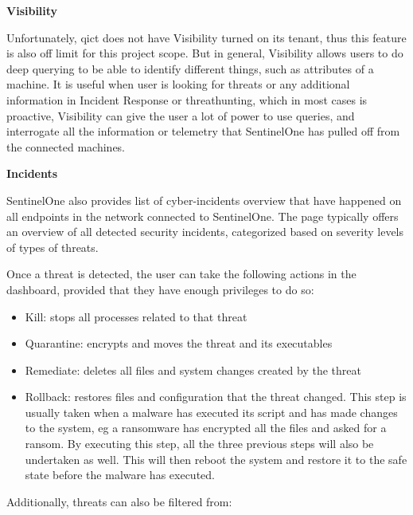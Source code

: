 \begin{multicols}{2}
      \textbf{Visibility}

      Unfortunately, \acrshort{qict} does not have Visibility turned on its tenant, thus this feature is also off limit for this project
      scope. But in general, Visibility allows users to do deep querying to be able to identify different things, such as attributes of
      a machine. It is useful when user is looking for threats or any additional information in Incident Response or \gls{threathunting},
      which in most cases is proactive, Visibility can give the user a lot of power to use queries, and interrogate all the information
      or telemetry that SentinelOne has pulled off from the connected machines.

      \textbf{Incidents}

      SentinelOne also provides list of cyber-incidents overview that have happened on all endpoints in the network connected to
      SentinelOne. The page typically offers an overview of all detected security incidents, categorized based on severity levels
      of types of threats.

      Once a threat is detected, the user can take the following actions in the dashboard, provided that they have enough privileges
      to do so:
      \begin{itemize}
            \item Kill: stops all processes related to that threat
            \item Quarantine: encrypts and moves the threat and its executables
            \item Remediate: deletes all files and system changes created by the threat
            \item Rollback: restores files and configuration that the threat changed. This step is usually taken when a malware has
                  executed its script and has made changes to the system, \acrshort{eg} a ransomware has encrypted all the files and
                  asked for a ransom. By executing this step, all the three previous steps will also be undertaken as well. This will
                  then reboot the system and restore it to the safe state before the malware has executed.
      \end{itemize}

      Additionally, threats can also be filtered from:
\end{multicols}
